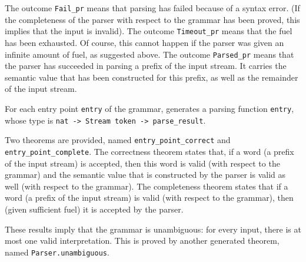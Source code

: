 \documentclass[onecolumn,11pt,nocopyrightspace,preprint]{sigplanconf}
\begin{document}
The outcome \verb+Fail_pr+ means that parsing has failed because of a syntax
error. (If the completeness of the parser with respect to the grammar has been
proved, this implies that the input is invalid). The outcome \verb+Timeout_pr+
means that the fuel has been exhausted. Of course, this cannot happen if the
parser was given an infinite amount of fuel, as suggested above. The outcome
\verb+Parsed_pr+ means that the parser has succeeded in parsing a prefix of
the input stream. It carries the semantic value that has been constructed for
this prefix, as well as the remainder of the input stream.

For each entry point \verb+entry+ of the grammar, \menhir generates a
parsing function \verb+entry+, whose type is
\verb+nat -> Stream token -> parse_result+.


Two theorems are provided, named \verb+entry_point_correct+ and
\verb+entry_point_complete+. The correctness theorem states that, if a word (a
prefix of the input stream) is accepted, then this word is valid (with respect
to the grammar) and the semantic value that is constructed by the parser is
valid as well (with respect to the grammar). The completeness theorem states
that if a word (a prefix of the input stream) is valid (with respect to the
grammar), then (given sufficient fuel) it is accepted by the parser.

These results imply that the grammar is unambiguous: for every input, there is
at most one valid interpretation. This is proved by another generated theorem,
named \verb+Parser.unambiguous+.



\end{document}
